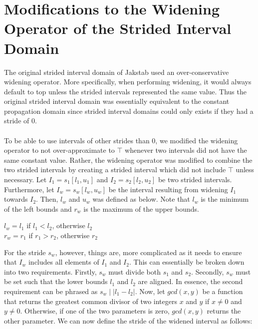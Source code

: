 \documentclass{kththesis}
\begin{document}
\section{Modifications to the Widening Operator of the Strided Interval Domain}
The original strided interval domain of Jakstab used an over-conservative widening operator. More specifically, when performing widening, it would always default to top unless the strided intervals represented the same value. Thus the original strided interval domain was essentially equivalent to the constant propagation domain since strided interval domains could only exists if they had a stride of $0$.
\\ \\
To be able to use intervals of other strides than $0$, we modified the widening operator to not over-approximate to $\top$ whenever two intervals did not have the same constant value. Rather, the widening operator was modified to combine the two strided intervals by creating a strided interval which did not include $\top$ unless necessary. Let $I_1=s_1[l_1,u_1]$ and $I_2=s_2[l_2,u_2]$ be two strided intervals. Furthermore, let $I_w=s_w[l_w,u_w]$ be the interval resulting from widening $I_1$ towards $I_2$. Then, $l_w$ and $u_w$ was defined as below. Note that $l_w$ is the minimum of the left bounds and $r_w$ is the maximum of the upper bounds.
\begin{center}
$l_w = l_1$ if $l_1 < l_2$, otherwise $l_2$\\
$r_w = r_1$ if $r_1 > r_2$, otherwise $r_2$
\end{center}
For the stride $s_w$, however, things are, more complicated as it needs to ensure that $I_w$ includes all elements of $I_1$ and $I_2$. This can essentially be broken down into two requirements. Firstly, $s_w$ must divide both $s_1$ and $s_2$. Secondly, $s_w$ must be set such that the lower bounds $l_1$ and $l_2$ are aligned. In essence, the second requirement can be phrased as $s_w\mid \lvert l_1-l_2 \rvert$. Now, let $gcd(x,y)$ be a function that returns the greatest common divisor of two integers $x$ and $y$ if $x\neq0$ and $y\neq0$. Otherwise, if one of the two parameters is zero, $gcd(x,y)$ returns the other parameter. We can now define the stride of the widened interval as follows:
\end{document}
